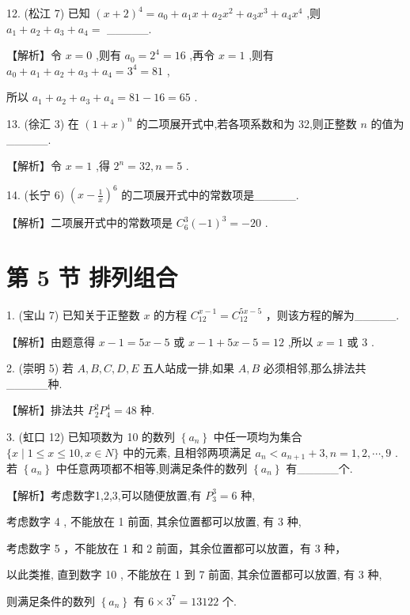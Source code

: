 \documentclass[10pt]{article}
\begin{document}
12. (松江 7) 已知 \({\left( x + 2\right) }^{4} = {a}_{0} + {a}_{1}x + {a}_{2}{x}^{2} + {a}_{3}{x}^{3} + {a}_{4}{x}^{4}\) ,则 \({a}_{1} + {a}_{2} + {a}_{3} + {a}_{4} =\) \_\_\_\_\_.

【解析】令 \(x = 0\) ,则有 \({a}_{0} = {2}^{4} = {16}\) ,再令 \(x = 1\) ,则有 \({a}_{0} + {a}_{1} + {a}_{2} + {a}_{3} + {a}_{4} = {3}^{4} = {81}\) ,

所以 \({a}_{1} + {a}_{2} + {a}_{3} + {a}_{4} = {81} - {16} = {65}\) .

13. (徐汇 3) 在 \({\left( 1 + x\right) }^{n}\) 的二项展开式中,若各项系数和为 32,则正整数 \(n\) 的值为\_\_\_\_\_.

【解析】令 \(x = 1\) ,得 \({2}^{n} = {32},n = 5\) .

14. (长宁 6) \({\left( x - \frac{1}{x}\right) }^{6}\) 的二项展开式中的常数项是\_\_\_\_\_.

【解析】二项展开式中的常数项是 \({C}_{6}^{3}{\left( -1\right) }^{3} =  - {20}\) .

\section*{第 5 节 排列组合}

1. (宝山 7) 已知关于正整数 \(x\) 的方程 \({C}_{12}^{x - 1} = {C}_{12}^{{5x} - 5}\) ，则该方程的解为\_\_\_\_\_.

【解析】由题意得 \(x - 1 = {5x} - 5\) 或 \(x - 1 + {5x} - 5 = {12}\) ,所以 \(x = 1\) 或 3 .

2. (崇明 5) 若 \(A,B,C,D,E\) 五人站成一排,如果 \(A,B\) 必须相邻,那么排法共\_\_\_\_\_种.

【解析】排法共 \({P}_{2}^{2}{P}_{4}^{4} = {48}\) 种.

3. (虹口 12) 已知项数为 10 的数列 \(\left\{  {a}_{n}\right\}\) 中任一项均为集合 \(\{ x \mid  1 \leq  x \leq  {10},x \in  N\}\) 中的元素, 且相邻两项满足 \({a}_{n} < {a}_{n + 1} + 3,n = 1,2,\cdots ,9\) . 若 \(\left\{  {a}_{n}\right\}\) 中任意两项都不相等,则满足条件的数列 \(\left\{  {a}_{n}\right\}\) 有\_\_\_\_\_个.

【解析】考虑数字1,2,3,可以随便放置,有 \({P}_{3}^{3} = 6\) 种,

考虑数字 4 , 不能放在 1 前面, 其余位置都可以放置, 有 3 种,

考虑数字 5 ，不能放在 1 和 2 前面，其余位置都可以放置，有 3 种，

以此类推, 直到数字 10 , 不能放在 1 到 7 前面, 其余位置都可以放置, 有 3 种,

则满足条件的数列 \(\left\{  {a}_{n}\right\}\) 有 \(6 \times  {3}^{7} = {13122}\) 个.
\end{document}
